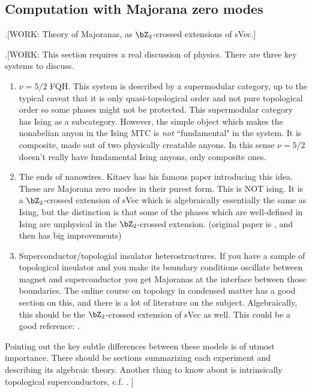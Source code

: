 \subsection{Computation with Majorana zero modes}

.[WORK: Theory of Majoranas, as $\bZ_2$-crossed extensions of sVec.]

.[WORK: This section requires a real discussion of physics. There are three key systems to discuss.

\begin{enumerate}
\item $\nu=5/2$ FQH. This system is described by a supermodular category, up to the typical caveat that it is only quasi-topological order and not pure topological order so some phases might not be protected. This supermodular category has Ising as a subcategory. However, the simple object which makes the nonabelian anyon in the Ising MTC is \textit{not} ``fundamental" in the system. It is composite, made out of two physically creatable anyons. In this sense $\nu =5/2$ doesn't really have fundamental Ising anyons, only composite ones.

\item The ends of nanowires. Kitaev has his famous paper introducing this idea. These are Majorana zero modes in their purest form. This is NOT ising. It is a $\bZ_2$-crossed extension of sVec which is algebraically essentially the same as Ising, but the distinction is that some of the phases which are well-defined in Ising are unphysical in the $\bZ_2$-crossed extension. (original paper is \cite{kitaev2001unpaired}, and then \cite{fidkowski2011topological} has big improvements)

\item Superconductor/topologial insulator heterostructures. If you have a sample of topological insulator and you make its boundary conditions oscillate between magnet and superconductor you get Majoranas at the interface between those boundaries. The online course on topology in condensed matter has a good section on this, and there is a lot of literature on the subject. Algebraically, this should be the $\bZ_2$-crossed extension of sVec as well. This could be a good reference: \cite{son2019commuting}.
\end{enumerate}

Pointing out the key subtle differences between these models is of utmost importance. There should be sections summarizing each experiment and describing its algebraic theory. Another thing to know about is intrinsically topological superconductors, c.f. \cite{bonderson2013time}.
]

